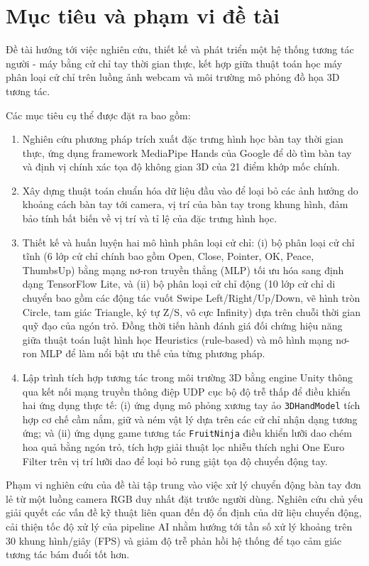\documentclass[../BTL.tex]{subfiles}
\begin{document}
\section{Mục tiêu và phạm vi đề tài}
\label{section:1.2}
Đề tài hướng tới việc nghiên cứu, thiết kế và phát triển một hệ thống tương tác người - máy bằng cử chỉ tay thời gian thực, kết hợp giữa thuật toán học máy phân loại cử chỉ trên luồng ảnh webcam và môi trường mô phỏng đồ họa 3D tương tác.

Các mục tiêu cụ thể được đặt ra bao gồm:
\begin{enumerate}
    \item Nghiên cứu phương pháp trích xuất đặc trưng hình học bàn tay thời gian thực, ứng dụng framework MediaPipe Hands của Google để dò tìm bàn tay và định vị chính xác tọa độ không gian 3D của 21 điểm khớp mốc chính.
    \item Xây dựng thuật toán chuẩn hóa dữ liệu đầu vào để loại bỏ các ảnh hưởng do khoảng cách bàn tay tới camera, vị trí của bàn tay trong khung hình, đảm bảo tính bất biến về vị trí và tỉ lệ của đặc trưng hình học.
    \item Thiết kế và huấn luyện hai mô hình phân loại cử chỉ: (i) bộ phân loại cử chỉ tĩnh (6 lớp cử chỉ chính bao gồm Open, Close, Pointer, OK, Peace, ThumbsUp) bằng mạng nơ-ron truyền thẳng (MLP) tối ưu hóa sang định dạng TensorFlow Lite, và (ii) bộ phân loại cử chỉ động (10 lớp cử chỉ di chuyển bao gồm các động tác vuốt Swipe Left/Right/Up/Down, vẽ hình tròn Circle, tam giác Triangle, ký tự Z/S, vô cực Infinity) dựa trên chuỗi thời gian quỹ đạo của ngón trỏ. Đồng thời tiến hành đánh giá đối chứng hiệu năng giữa thuật toán luật hình học Heuristics (rule-based) và mô hình mạng nơ-ron MLP để làm nổi bật ưu thế của từng phương pháp.
    \item Lập trình tích hợp tương tác trong môi trường 3D bằng engine Unity thông qua kết nối mạng truyền thông điệp UDP cục bộ độ trễ thấp để điều khiển hai ứng dụng thực tế: (i) ứng dụng mô phỏng xương tay ảo \texttt{3DHandModel} tích hợp cơ chế cầm nắm, giữ và ném vật lý dựa trên các cử chỉ nhận dạng tương ứng; và (ii) ứng dụng game tương tác \texttt{FruitNinja} điều khiển lưỡi dao chém hoa quả bằng ngón trỏ, tích hợp giải thuật lọc nhiễu thích nghi One Euro Filter trên vị trí lưỡi dao để loại bỏ rung giật tọa độ chuyển động tay.
\end{enumerate}

Phạm vi nghiên cứu của đề tài tập trung vào việc xử lý chuyển động bàn tay đơn lẻ từ một luồng camera RGB duy nhất đặt trước người dùng. Nghiên cứu chủ yếu giải quyết các vấn đề kỹ thuật liên quan đến độ ổn định của dữ liệu chuyển động, cải thiện tốc độ xử lý của pipeline AI nhằm hướng tới tần số xử lý khoảng trên 30 khung hình/giây (FPS) và giảm độ trễ phản hồi hệ thống để tạo cảm giác tương tác bám đuổi tốt hơn.
\end{document}
